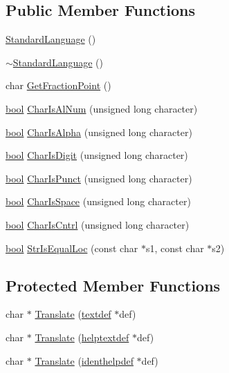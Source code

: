 \subsection*{Public Member Functions}
\begin{DoxyCompactItemize}
\item 
\hyperlink{classStandardLanguage_a0d604e2af2f2bf4dc4abbe7b18c05cea}{Standard\+Language} ()
\item 
\hyperlink{classStandardLanguage_a21a7e329043a38b838b73feee36ebcfa}{$\sim$\+Standard\+Language} ()
\item 
char \hyperlink{classStandardLanguage_a291d9c45352a324482f63738f8cbfe9f}{Get\+Fraction\+Point} ()
\item 
\hyperlink{platform_8h_a1062901a7428fdd9c7f180f5e01ea056}{bool} \hyperlink{classStandardLanguage_a1de5d6a7b40037afc079e1d5a3ce65e7}{Char\+Is\+Al\+Num} (unsigned long character)
\item 
\hyperlink{platform_8h_a1062901a7428fdd9c7f180f5e01ea056}{bool} \hyperlink{classStandardLanguage_a615e7e7fe6fd04084f0a59ecaed2f7d6}{Char\+Is\+Alpha} (unsigned long character)
\item 
\hyperlink{platform_8h_a1062901a7428fdd9c7f180f5e01ea056}{bool} \hyperlink{classStandardLanguage_aa884e2cd9f3778bb85bf4b7c67a1d62d}{Char\+Is\+Digit} (unsigned long character)
\item 
\hyperlink{platform_8h_a1062901a7428fdd9c7f180f5e01ea056}{bool} \hyperlink{classStandardLanguage_a3dbeae5f049069a2646ebf137c6cb4a5}{Char\+Is\+Punct} (unsigned long character)
\item 
\hyperlink{platform_8h_a1062901a7428fdd9c7f180f5e01ea056}{bool} \hyperlink{classStandardLanguage_afcc504da29308380fd0ada0f46ad940d}{Char\+Is\+Space} (unsigned long character)
\item 
\hyperlink{platform_8h_a1062901a7428fdd9c7f180f5e01ea056}{bool} \hyperlink{classStandardLanguage_a6e79e25699739742aa2abd43bf3fd469}{Char\+Is\+Cntrl} (unsigned long character)
\item 
\hyperlink{platform_8h_a1062901a7428fdd9c7f180f5e01ea056}{bool} \hyperlink{classStandardLanguage_ac3062fe9cb6298205f0deee955ebf36e}{Str\+Is\+Equal\+Loc} (const char $\ast$s1, const char $\ast$s2)
\end{DoxyCompactItemize}
\subsection*{Protected Member Functions}
\begin{DoxyCompactItemize}
\item 
char $\ast$ \hyperlink{classStandardLanguage_a0472d7747cfb0985f20b483756327fdc}{Translate} (\hyperlink{structtextdef}{textdef} $\ast$def)
\item 
char $\ast$ \hyperlink{classStandardLanguage_a5a7011f9307a053509a28706f02f835f}{Translate} (\hyperlink{structhelptextdef}{helptextdef} $\ast$def)
\item 
char $\ast$ \hyperlink{classStandardLanguage_a623162a4830eaec08bc266cd3fa6068e}{Translate} (\hyperlink{structidenthelpdef}{identhelpdef} $\ast$def)
\end{DoxyCompactItemize}
